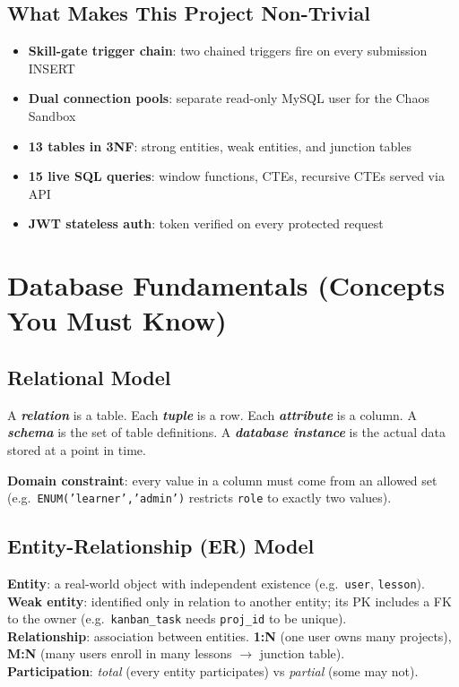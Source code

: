 \documentclass[11pt,a4paper]{article}
\newcommand{\term}[1]{\textbf{\textit{#1}}}
\newcommand{\T}[1]{\texttt{#1}}          %
\begin{document}
\subsection{What Makes This Project Non-Trivial}

\begin{itemize}[nosep, leftmargin=1.5em]
  \item \textbf{Skill-gate trigger chain}: two chained triggers fire on every submission INSERT
  \item \textbf{Dual connection pools}: separate read-only MySQL user for the Chaos Sandbox
  \item \textbf{13 tables in 3NF}: strong entities, weak entities, and junction tables
  \item \textbf{15 live SQL queries}: window functions, CTEs, recursive CTEs served via API
  \item \textbf{JWT stateless auth}: token verified on every protected request
\end{itemize}

\section{Database Fundamentals (Concepts You Must Know)}

\subsection{Relational Model}

\begin{defbox}
A \term{relation} is a table. Each \term{tuple} is a row. Each \term{attribute} is a
column. A \term{schema} is the set of table definitions. A \term{database instance} is
the actual data stored at a point in time.
\end{defbox}

\textbf{Domain constraint}: every value in a column must come from an allowed set (e.g.\
\T{ENUM('learner','admin')} restricts \T{role} to exactly two values).

\subsection{Entity-Relationship (ER) Model}

\begin{defbox}
\textbf{Entity}: a real-world object with independent existence (e.g.\ \T{user}, \T{lesson}).\\
\textbf{Weak entity}: identified only in relation to another entity; its PK includes a
  FK to the owner (e.g.\ \T{kanban\_task} needs \T{proj\_id} to be unique).\\
\textbf{Relationship}: association between entities. \textbf{1:N} (one user owns many
  projects), \textbf{M:N} (many users enroll in many lessons $\to$ junction table).\\
\textbf{Participation}: \textit{total} (every entity participates) vs
  \textit{partial} (some may not).
\end{defbox}
\end{document}
